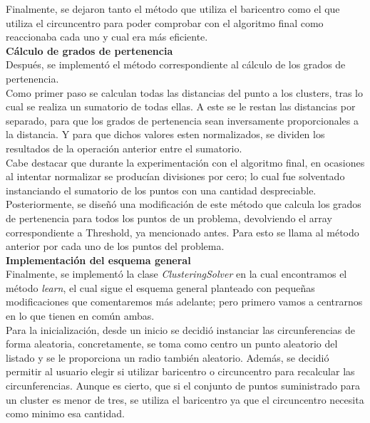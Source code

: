 \documentclass[conference,a4paper]{IEEEtran}
\begin{document}
Finalmente, se dejaron tanto el método que utiliza el baricentro como el que utiliza el circuncentro para poder comprobar con el algoritmo final como reaccionaba cada uno y cual era más eficiente.\\

\textbf{Cálculo de grados de pertenencia}\\

Después, se implementó el método correspondiente al cálculo de los grados de pertenencia.\\
Como primer paso se calculan todas las distancias del punto a los clusters, tras lo cual se realiza un sumatorio de todas ellas. A este se le restan las distancias por separado, para que los grados de pertenencia sean inversamente proporcionales a la distancia. Y para que dichos valores esten normalizados, se dividen los resultados de la operación anterior entre el sumatorio.\\
Cabe destacar que durante la experimentación con el algoritmo final, en ocasiones al intentar normalizar se producían divisiones por cero; lo cual fue solventado instanciando el sumatorio de los puntos con una cantidad despreciable.\\
Posteriormente, se diseñó una modificación de este método que calcula los grados de pertenencia para todos los puntos de un problema, devolviendo el array correspondiente a Threshold, ya mencionado antes. Para esto se llama al método anterior por cada uno de los puntos del problema.\\

\textbf{Implementación del esquema general}\\

Finalmente, se implementó la clase \textit{ClusteringSolver} en la cual encontramos el método \textit{learn}, el cual sigue el esquema general planteado con pequeñas modificaciones que comentaremos más adelante; pero primero vamos a centrarnos en lo que tienen en común ambas.\\

Para la inicialización, desde un inicio se decidió instanciar las circunferencias de forma aleatoria, concretamente, se toma como centro un punto aleatorio del listado y se le proporciona un radio también aleatorio. Además, se decidió permitir al usuario elegir si utilizar baricentro o circuncentro para recalcular las circunferencias. Aunque es cierto, que si el conjunto de puntos suministrado para un cluster es menor de tres, se utiliza el baricentro ya que el circuncentro necesita como minimo esa cantidad.\\
\end{document}
